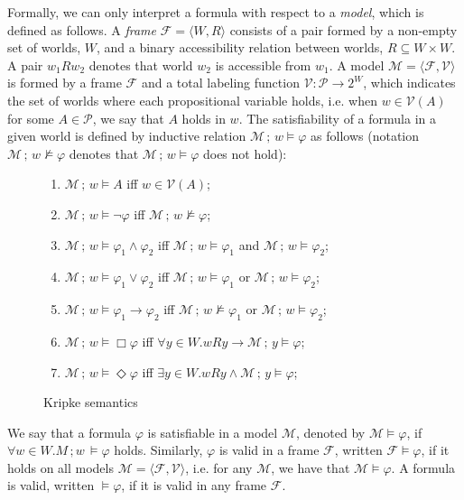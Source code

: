 \documentclass[sigconf]{acmart}
\begin{document}
Formally, we can only interpret a formula with respect to a \emph{model}, which is
defined as follows.
A \emph{frame} $\mathcal{F} = \langle W, R \rangle$ consists of a pair formed by
a non-empty set of worlds, $W$, and a binary accessibility relation between
worlds, $R \subseteq W \times W$. A pair $w_1Rw_2$ denotes that world $w_2$ is
accessible from $w_1$. A model $\mathcal{M} = \langle \mathcal{F}, \mathcal{V} \rangle$
is formed by a frame $\mathcal{F}$ and a total labeling function
$\mathcal{V} : \mathcal{P}\to 2^W$, which indicates the set of worlds where each propositional variable holds, i.e. when $w \in \mathcal{V}(A)$
for some $A \in\mathcal{P}$, we say that $A$ holds in $w$. The satisfiability of a formula
in a given world is defined by inductive relation $\mathcal{M}\,;\,w\models \varphi$ as
follows (notation $\mathcal{M}\,;\,w\not\models \varphi$ denotes
that $\mathcal{M}\,;\,w\models \varphi$ does not hold):

\begin{figure}[H]
\begin{enumerate}
  \item $\mathcal{M}\,;\,w\models A$ iff $w \in \mathcal{V}(A)$;
  \item $\mathcal{M}\,;\,w\models \neg\varphi$ iff $\mathcal{M}\,;\,w\not\models\varphi$;
  \item $\mathcal{M}\,;\,w\models \varphi_1 \land \varphi_2$ iff
    $\mathcal{M}\,;\,w\models\varphi_1$ and $\mathcal{M}\,;\,w\models\varphi_2$;
  \item $\mathcal{M}\,;\,w\models \varphi_1 \lor \varphi_2$ iff
    $\mathcal{M}\,;\,w\models\varphi_1$ or $\mathcal{M}\,;\,w\models\varphi_2$;
  \item $\mathcal{M}\,;\,w\models \varphi_1 \to \varphi_2$ iff
    $\mathcal{M}\,;\,w\not\models\varphi_1$ or $\mathcal{M}\,;\,w\models\varphi_2$;
  \item $\mathcal{M}\,;\,w\models\Box\varphi$ iff $\forall y \in W. w R y \to \mathcal{M}\,;\,y \models\varphi$;
  \item $\mathcal{M}\,;\,w\models\Diamond\varphi$ iff $\exists y \in W. w R y \land \mathcal{M}\,;\,y \models\varphi$;
  \end{enumerate}
  \caption{Kripke semantics}
  \label{fig:kripke}
\end{figure}
We say that a formula $\varphi$ is satisfiable in a model $\mathcal{M}$,
denoted by $\mathcal{M}\models \varphi$, if $\forall w \in W. M\,;w\,\models \varphi$ holds.
Similarly, $\varphi$ is valid in a frame $\mathcal{F}$, written $\mathcal{F}\models\varphi$, if
it holds on all models $\mathcal{M} = \langle \mathcal{F},\mathcal{V}\rangle$, i.e.
for any $\mathcal{M}$, we have that $\mathcal{M}\models\varphi$. A formula
is valid, written $\models \varphi$, if it is valid in any frame $\mathcal{F}$.
\end{document}
